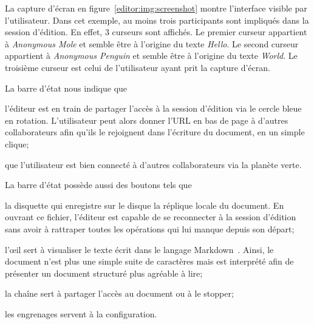 La capture d'écran en figure~\ref{editor:img:screenshot} montre l'interface
visible par l'utilisateur. Dans cet exemple, au moins trois participants sont
impliqués dans la session d'édition. En effet, 3 curseurs sont affichés. Le
premier curseur appartient à \emph{Anonymous Mole} et semble être à l'origine du
texte \emph{Hello}. Le second curseur appartient à \emph{Anonymous Penguin} et
semble être à l'origine du texte \emph{World}. Le troisième curseur est celui de
l'utilisateur ayant prit la capture d'écran.

La barre d'état nous indique que
\begin{inparaenum}[(i)]
\item l'éditeur est en train de partager l'accès à la session d'édition via le
  cercle bleue en rotation. L'utilisateur peut alors donner l'URL en bas de page
  à d'autres collaborateurs afin qu'ils le rejoignent dans l'écriture du
  document, en un simple clique;
\item que l'utilisateur est bien connecté à d'autres collaborateurs via la
  planète verte.
\end{inparaenum}

La barre d'état possède aussi des boutons tels que
\begin{inparaenum}[(i)]
\item la disquette qui enregistre sur le disque la réplique locale du
  document. En ouvrant ce fichier, l'éditeur est capable de se reconnecter à la
  session d'édition sans avoir à rattraper toutes les opérations qui lui manque
  depuis son départ;
\item l'œil sert à visualiser le texte écrit dans le langage
  Markdown~\cite{markdown}. Ainsi, le document n'est plus une simple suite de
  caractères mais est interprété afin de présenter un document structuré plus
  agréable à lire;
\item la chaîne sert à partager l'accès au document ou à le stopper;
\item les engrenages servent à la configuration.
\end{inparaenum}


